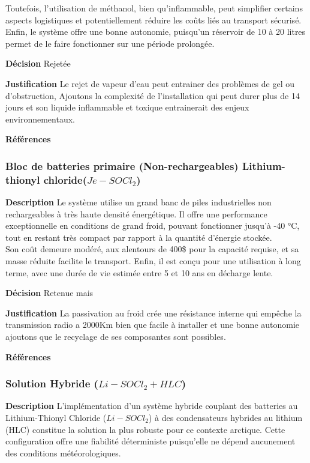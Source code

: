 Toutefois, l’utilisation de méthanol, bien qu’inflammable, peut simplifier certains aspects logistiques et potentiellement réduire les coûts liés au transport sécurisé. Enfin, le système offre une bonne autonomie, puisqu’un réservoir de 10 à 20 litres permet de le faire fonctionner sur une période prolongée.
\smallskip

\noindent\textbf{Décision} Rejetée
\smallskip

\noindent\textbf{Justification} Le rejet de vapeur d’eau peut entrainer des problèmes de gel ou d’obstruction, Ajoutons la complexité de l’installation qui peut durer plus de 14 jours et son liquide inflammable et toxique entrainerait des enjeux environnementaux. 
\smallskip

\noindent\textbf{Références}
\cite{PileCombustibe1}

\subsubsection{Bloc de batteries primaire (Non-rechargeables) Lithium-thionyl chloride($Je - SOCl_2$)}
\label{sec:bloc}
\noindent\textbf{Description} Le système utilise un grand banc de piles industrielles non rechargeables à très haute densité énergétique. Il offre une performance exceptionnelle en conditions de grand froid, pouvant fonctionner jusqu’à -40 °C, tout en restant très compact par rapport à la quantité d’énergie stockée. 
\\

Son coût demeure modéré, aux alentours de 400\$ pour la capacité requise, et sa masse réduite facilite le transport. Enfin, il est conçu pour une utilisation à long terme, avec une durée de vie estimée entre 5 et 10 ans en décharge lente.
\smallskip

\noindent\textbf{Décision} Retenue mais
\smallskip

\noindent\textbf{Justification} La passivation au froid crée une résistance interne qui empêche la transmission radio a 2000Km bien que facile à installer et une bonne autonomie ajoutons que le recyclage de ses composantes sont possibles.
\smallskip

\noindent\textbf{Références} 
\cite{BlocBatterie1}

\subsubsection{Solution Hybride ($Li-SOCl_2 + HLC$)}
\label{sec:hybri}
\noindent\textbf{Description} L’implémentation d’un système hybride couplant des batteries au Lithium-Thionyl Chloride ($Li-SOCl_2$) à des condensateurs hybrides au lithium (HLC) constitue la solution la plus robuste pour ce contexte arctique. Cette configuration offre une fiabilité déterministe puisqu'elle ne dépend aucunement des conditions météorologiques. 
\\

